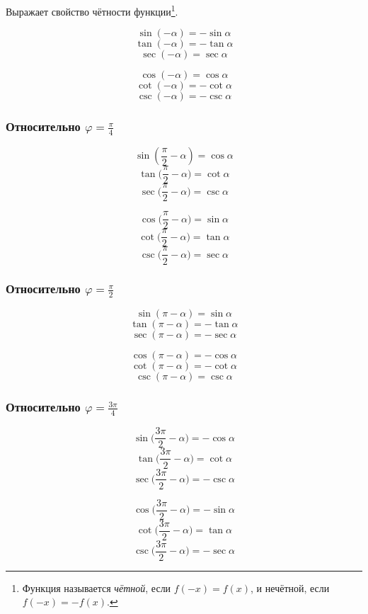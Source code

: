 \documentclass[
  letterpaper,
  DIV=11,
  numbers=noendperiod]{scrreprt}
\theoremstyle{definition}
\theoremstyle{remark}
\begin{document}
Выражает свойство чётности функции\footnote{Функция называется
  \emph{чётной}, если \(f(-x) = f(x)\), и нечётной, если
  \(f(-x) = -f(x)\).}.

\[\sin (-\alpha) = -\sin \alpha\] \[\tan (-\alpha) = -\tan \alpha\]
\[\sec (-\alpha) = \sec \alpha\]

\[\cos (-\alpha) = \cos \alpha\] \[\cot (-\alpha) = -\cot \alpha\]
\[\csc (-\alpha) = -\csc \alpha\]

\subsubsection{\texorpdfstring{Относительно
\(\varphi = \frac{\pi}{4}\)}{Относительно \textbackslash varphi = \textbackslash frac\{\textbackslash pi\}\{4\}}}\label{trig_reflections_pi4}

\[\sin (\frac{\pi}{2}-\alpha) = \cos \alpha\]
\[\tan \Big(\frac{\pi}{2}-\alpha\Big) = \cot \alpha\]
\[\sec \Big(\frac{\pi}{2}-\alpha\Big) = \csc \alpha\]

\[\cos \Big(\frac{\pi}{2}-\alpha\Big) = \sin \alpha\]
\[\cot \Big(\frac{\pi}{2}-\alpha\Big) = \tan \alpha\]
\[\csc \Big(\frac{\pi}{2}-\alpha\Big) = \sec \alpha\]

\subsubsection{\texorpdfstring{Относительно
\(\varphi = \frac{\pi}{2}\)}{Относительно \textbackslash varphi = \textbackslash frac\{\textbackslash pi\}\{2\}}}\label{trig_reflections_pi2}

\[\sin (\pi-\alpha) = \sin \alpha\] \[\tan (\pi-\alpha) = -\tan \alpha\]
\[\sec (\pi-\alpha) = -\sec \alpha\]

\[\cos (\pi-\alpha) = -\cos \alpha\]
\[\cot (\pi-\alpha) = -\cot \alpha\] \[\csc (\pi-\alpha) = \csc \alpha\]

\subsubsection{\texorpdfstring{Относительно
\(\varphi = \frac{3\pi}{4}\)}{Относительно \textbackslash varphi = \textbackslash frac\{3\textbackslash pi\}\{4\}}}\label{trig_reflections_3pi2}

\[\sin \Big(\frac{3\pi}{2}-\alpha\Big) = -\cos \alpha\]
\[\tan \Big(\frac{3\pi}{2}-\alpha\Big) = \cot \alpha\]
\[\sec \Big(\frac{3\pi}{2}-\alpha\Big) = -\csc \alpha\]

\[\cos \Big(\frac{3\pi}{2}-\alpha\Big) = -\sin \alpha\]
\[\cot \Big(\frac{3\pi}{2}-\alpha\Big) = \tan \alpha\]
\[\csc \Big(\frac{3\pi}{2}-\alpha\Big) = -\sec \alpha\]
\end{document}
